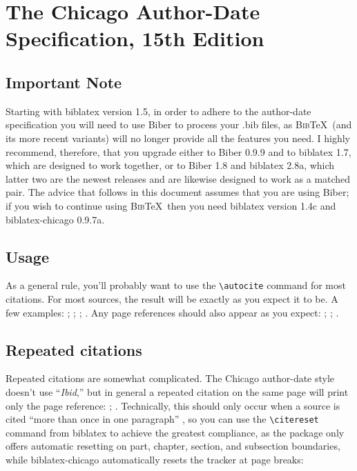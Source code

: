 \documentclass[a4paper,12pt]{report}
\newcommand{\cmd}[1]{\texttt{\textbackslash #1}}
\begin{document}
\section*{The Chicago Author-Date Specification, 15th Edition}
\label{sec:spec}

\subsection*{Important Note}
\label{bibernote}

Starting with \textsf{biblatex} version 1.5, in order to adhere to the
author-date specification you will need to use \textsf{Biber} to
process your .bib files, as \textsc{Bib}\TeX\ (and its more recent
variants) will no longer provide all the features you need.  I highly
recommend, therefore, that you upgrade either to \textsf{Biber} 0.9.9
and to \textsf{biblatex} 1.7, which are designed to work together, or
to \textsf{Biber} 1.8 and \textsf{biblatex} 2.8a, which latter two are
the newest releases and are likewise designed to work as a matched
pair.  The advice that follows in this document assumes that you are
using \textsf{Biber}; if you wish to continue using \textsc{Bib}\TeX\
then you need \textsf{biblatex} version 1.4c and
\textsf{biblatex-chicago} 0.9.7a.

\subsection*{Usage}
\label{usage}

As a general rule, you'll probably want to use the \cmd{autocite}
command for most citations.  For most sources, the result will be
exactly as you expect it to be.  A few examples:
\autocite{adorno:benj}; \autocite{ashbrook:brain};
\autocite{babb:peru}; \autocite{barcott:review:15}.  Any page
references should also appear as you expect: \autocite[338]{batson};
\autocite[79]{beattie:crime}; \autocite[36]{boxer:china}.

\subsection*{Repeated citations}
\label{sec:ibidem}

Repeated citations are somewhat complicated.  The Chicago author-date
style doesn't use \enquote{\emph{Ibid},} but in general a repeated
citation on the same page will print only the page reference:
\autocite{browning:aurora}; \autocite[45]{browning:aurora}.
Technically, this should only occur when a source is cited
\enquote{more than once in one paragraph}
\autocite[16.114]{chicago:manual:15}, so you can use the
\cmd{citereset} command from \textsf{biblatex} to achieve the greatest
compliance, as the package only offers automatic resetting on part,
chapter, section, and subsection boundaries, while
\textsf{biblatex-chicago} automatically resets the tracker at page
breaks:
\end{document}
